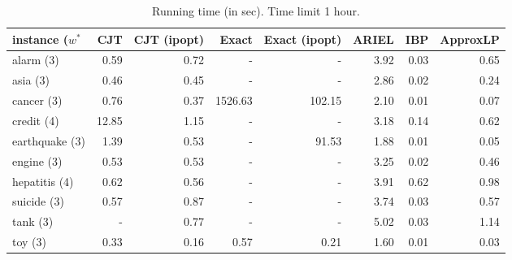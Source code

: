 \documentclass{article}
\begin{document}
\begin{table}[]
    \centering
    \begin{tabular}{l|r|r|r|r|r|r|r}
    instance ($w^*$  & CJT & CJT (ipopt) & Exact & Exact (ipopt) & ARIEL & IBP & ApproxLP \\
    \toprule
    alarm (3)     & 0.59 & 0.72 & - & - & 3.92 & 0.03 & 0.65 \\
    asia (3)      & 0.46 & 0.45 & - & - & 2.86 & 0.02 & 0.24 \\
    cancer (3)    & 0.76 & 0.37 & 1526.63 & 102.15 & 2.10 & 0.01 & 0.07 \\
    credit (4)    & 12.85 & 1.15 & - & - & 3.18 & 0.14 & 0.62 \\
    earthquake (3) & 1.39 & 0.53 & - & 91.53 & 1.88 & 0.01 & 0.05 \\
    engine (3)    & 0.53 & 0.53 & - & - & 3.25 & 0.02 & 0.46 \\
    hepatitis (4) & 0.62 & 0.56 & - & - & 3.91 & 0.62 & 0.98 \\
    suicide (3)   & 0.57 & 0.87 & - & - & 3.74 & 0.03 & 0.57 \\
    tank (3)      & -    & 0.77 & - & - & 5.02 & 0.03 & 1.14 \\
    toy (3)       & 0.33 & 0.16 & 0.57 & 0.21 & 1.60 & 0.01 & 0.03
    
    \end{tabular}
    \caption{Running time (in sec). Time limit 1 hour.}
    \label{tab:placeholder}
\end{table}
\end{document}
